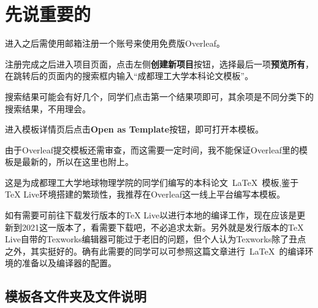 \chapter{先说重要的}

进入之后需使用邮箱注册一个账号来使用免费版Overleaf。

注册完成之后进入项目页面，点击左侧\textbf{创建新项目}按钮，选择最后一项\textbf{预览所有}，在跳转后的页面内的搜索框内输入“成都理工大学本科论文模板”。

搜索结果可能会有好几个，同学们点击第一个结果项即可，其余项是不同分类下的搜索结果，不用理会。

进入模板详情页后点击\textbf{Open as Template}按钮，即可打开本模板。

由于Overleaf提交模板还需审查，而这需要一定时间，我不能保证Overleaf里的模板是最新的，所以在这里也附上。

这是为成都理工大学地球物理学院的同学们编写的本科论文~\LaTeX~模板,鉴于TeX Live环境搭建的繁琐性，我推荐在Overleaf这一线上平台编写本模板。

如有需要可前往下载发行版本的TeX Live以进行本地的编译工作，现在应该是更新到2021这一版本了，看需要下载吧，不必追求太新。另外就是发行版本的TeX Live自带的Texworks编辑器可能过于老旧的问题，但个人认为Texworks除了丑点之外，其实挺好的。确有此需要的同学可以可参照这篇文章进行~\LaTeX~的编译环境的准备以及编译器的配置。

\section{模板各文件夹及文件说明}


